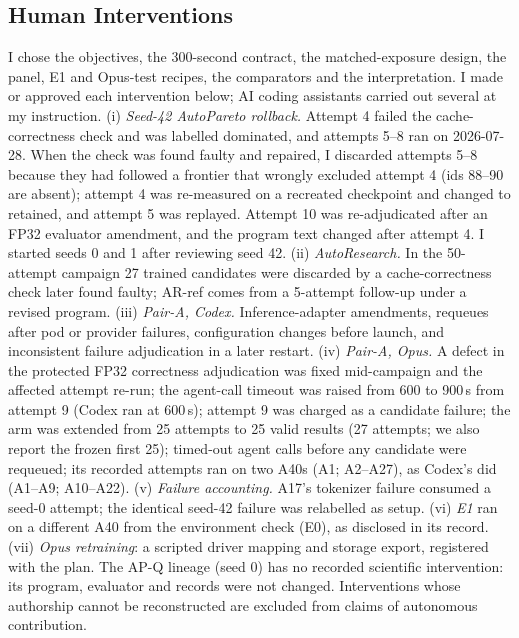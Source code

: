 \documentclass{article}
\begin{document}
\subsection{Human Interventions}\label{sec:interventions}
I chose the objectives, the 300-second contract, the matched-exposure design, the panel, E1 and Opus-test recipes, the comparators and the interpretation. I made or approved each intervention below; AI coding assistants carried out several at my instruction. (i) \emph{Seed-42 AutoPareto rollback.} Attempt 4 failed the cache-correctness check and was labelled dominated, and attempts 5--8 ran on 2026-07-28. When the check was found faulty and repaired, I discarded attempts 5--8 because they had followed a frontier that wrongly excluded attempt 4 (ids 88--90 are absent); attempt 4 was re-measured on a recreated checkpoint and changed to retained, and attempt 5 was replayed. Attempt 10 was re-adjudicated after an FP32 evaluator amendment, and the program text changed after attempt 4. I started seeds 0 and 1 after reviewing seed 42. (ii) \emph{AutoResearch.} In the 50-attempt campaign 27 trained candidates were discarded by a cache-correctness check later found faulty; AR-ref comes from a 5-attempt follow-up under a revised program. (iii) \emph{Pair-A, Codex.} Inference-adapter amendments, requeues after pod or provider failures, configuration changes before launch, and inconsistent failure adjudication in a later restart. (iv) \emph{Pair-A, Opus.} A defect in the protected FP32 correctness adjudication was fixed mid-campaign and the affected attempt re-run; the agent-call timeout was raised from 600 to 900\,s from attempt 9 (Codex ran at 600\,s); attempt 9 was charged as a candidate failure; the arm was extended from 25 attempts to 25 valid results (27 attempts; we also report the frozen first 25); timed-out agent calls before any candidate were requeued; its recorded attempts ran on two A40s (A1; A2--A27), as Codex's did (A1--A9; A10--A22). (v) \emph{Failure accounting.} A17's tokenizer failure consumed a seed-0 attempt; the identical seed-42 failure was relabelled as setup. (vi) \emph{E1} ran on a different A40 from the environment check (E0), as disclosed in its record. (vii) \emph{Opus retraining}: a scripted driver mapping and storage export, registered with the plan. The AP-Q lineage (seed 0) has no recorded scientific intervention: its program, evaluator and records were not changed. Interventions whose authorship cannot be reconstructed are excluded from claims of autonomous contribution.
\end{document}
